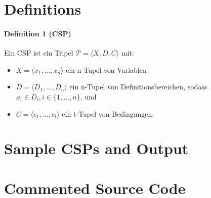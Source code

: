 \section{Definitions}\label{sec:apx:definitions}


\paragraph{Definition 1 (CSP)}
Ein CSP ist ein Tripel $\mathcal{P} = \langle X, D, C \rangle$ mit:

\begin{itemize}
    \item $X = \langle x_1, ..., x_n \rangle$ ein n-Tupel von Variablen
    \item $D = \langle D_1, ..., D_n \rangle$ ein n-Tupel von Definitionsbereichen, sodass $x_i \in D_i, i \in \{1, ..., n\}$, und
    \item $C = \langle c_1, ..., c_t \rangle$ ein t-Tupel von Bedingungen.
\end{itemize}



\section{Sample CSPs and Output}

\section{Commented Source Code}

